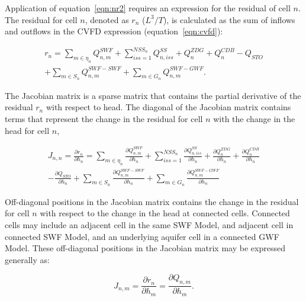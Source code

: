 \documentclass[fleqn]{article}
\begin{document}
Application of equation~\ref{eqn:nr2} requires an expression for the residual of cell $n$.  The residual for cell $n$, denoted as $r_n$ ($L^3/T$), is calculated as the sum of inflows and outflows in the CVFD expression (equation~\ref{eqn:cvfd}):

\begin{equation}
  \label{eqn:residual}
  \begin{split}
  r_n = 
  \sum \limits_{m \in \eta_{n}} Q_{n,m}^{SWF}
  + \sum \limits_{iss=1}^{NSS_n} Q_{n,iss}^{SS}
  + Q_n^{ZDG}
  + Q_n^{CDB}
  - Q_{STO} \\
  + \sum \limits_{m \in S_{n}} Q_{n,m}^{SWF-SWF}
  + \sum \limits_{m \in G_{n}} Q_{n,m}^{SWF-GWF}.
  \end{split}
\end{equation}

\noindent The Jacobian matrix is a sparse matrix that contains the partial derivative of the residual $r_n$ with respect to head.  The diagonal of the Jacobian matrix contains terms that represent the change in the residual for cell $n$ with the change in the head for cell $n$, 

\begin{equation}
\label{eqn:drndhn}
\begin{split}
J_{n,n} = 
\frac{\partial r_n}{\partial h_n} =  
\sum \limits_{m \in \eta_{n}} \frac{\partial Q_{n,m}^{SWF}}{\partial h_n}
+ \sum \limits_{iss=1}^{NSS_n} \frac{\partial Q_{n,iss}^{SS}}{\partial h_n}
+ \frac{\partial Q_n^{ZDG}}{\partial h_n}
+ \frac{\partial Q_n^{CDB}}{\partial h_n} \\
- \frac{\partial Q_{STO}}{\partial h_n}
+ \sum \limits_{m \in S_{n}} \frac{\partial Q_{n,m}^{SWF-SWF}}{\partial h_n}
+ \sum \limits_{m \in G_{n}} \frac{\partial Q_{n,m}^{SWF-GWF}}{\partial h_n}
\end{split}
\end{equation}

\noindent Off-diagonal positions in the Jacobian matrix contains the change in the residual for cell $n$ with respect to the change in the head at connected cells.  Connected cells may include an adjacent cell in the same SWF Model, and adjacent cell in connected SWF Model, and an underlying aquifer cell in a connected GWF Model.  These off-diagonal positions in the Jacobian matrix may be expressed generally as:

\begin{equation}
\label{eqn:drndhm}
J_{n,m} = \frac{\partial r_n}{\partial h_m} = \frac{\partial Q_{n,m}}{\partial h_m}.
\end{equation}
\end{document}
